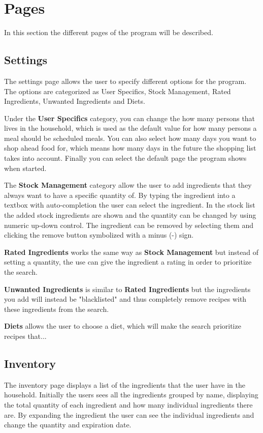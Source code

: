 \section{Pages}
In this section the different pages of the program will be described. 

\subsection{Settings} \label{ss:settings}
The settings page allows the user to specify different options for the program. The options are categorized as User Specifics, Stock Management, Rated Ingredients, Unwanted Ingredients and Diets.

Under the \textbf{User Specifics} category, you can change the how many persons that lives in the household, which is used as the default value for how many persons a meal should be scheduled meals. You can also select how many days you want to shop ahead food for, which means how many days in the future the shopping list takes into account. Finally you can select the default page the program shows when started.

The \textbf{Stock Management} category allow the user to add ingredients that they always want to have a specific quantity of. By typing the ingredient into a textbox with auto-completion the user can select the ingredient. In the stock list the added stock ingredients are shown and the quantity can be changed by using numeric up-down control. The ingredient can be removed by selecting them and clicking the remove button symbolized with a minus (-) sign.

\textbf{Rated Ingredients} works the same way as \textbf{Stock Management} but instead of setting a quantity, the use can give the ingredient a rating in order to prioritize the search. 

\textbf{Unwanted Ingredients} is similar to \textbf{Rated Ingredients} but the ingredients you add will instead be "blacklisted" and thus completely remove recipes with these ingredients from the search.

\textbf{Diets} allows the user to choose a diet, which will make the search prioritize recipes that... 

\subsection{Inventory}
The inventory page displays a list of the ingredients that the user have in the household. Initially the users sees all the ingredients grouped by name, displaying the total quantity of each ingredient and how many individual ingredients there are. By expanding the ingredient the user can see the individual ingredients and change the quantity and expiration date. 

